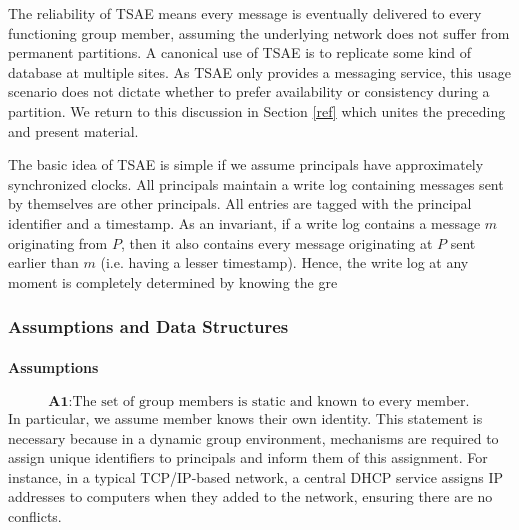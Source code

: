 \documentclass[]             %
{NASA}                       %
\theoremstyle{definition}
\begin{document}



The reliability of TSAE means every message is eventually delivered to
every functioning group member, assuming the underlying network does
not suffer from permanent partitions. A canonical use of TSAE is to
replicate some kind of database at multiple sites. As TSAE only
provides a messaging service, this usage scenario does not dictate
whether to prefer availability or consistency during a partition. We
return to this discussion in Section \ref{ref} which unites the
preceding and present material.

The basic idea of TSAE is simple if we assume principals have
approximately synchronized clocks. All principals maintain a write log
containing messages sent by themselves are other principals. All
entries are tagged with the principal identifier and a timestamp. As
an invariant, if a write log contains a message $m$ originating from
$P$, then it also contains every message originating at $P$ sent
earlier than $m$ (i.e. having a lesser timestamp). Hence, the write
log at any moment is completely determined by knowing the gre


\subsubsection{Assumptions and Data Structures}

\paragraph{Assumptions}

\[
  \textbf{A1}: \textrm{The set of group members is static and known to every member.}
\]
In particular, we assume member knows their own identity. This
statement is necessary because in a dynamic group environment,
mechanisms are required to assign unique identifiers to principals and
inform them of this assignment. For instance, in a typical
TCP/IP-based network, a central DHCP service assigns IP addresses to
computers when they added to the network, ensuring there are no
conflicts.
\end{document}
